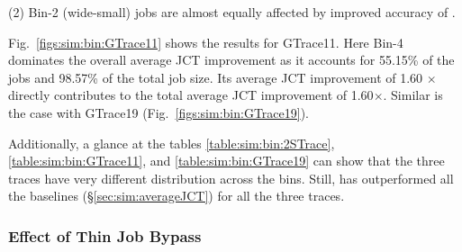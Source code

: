 (2) Bin-2 (wide-small) jobs are almost equally affected by improved accuracy of \slearn.


Fig.~\ref{figs:sim:bin:GTrace11} shows the results for GTrace11.
Here Bin-4 dominates the overall average JCT improvement as it accounts for
55.15\% of the jobs and 98.57\% of the total job size.  Its average JCT
improvement of 1.60 $\times$ directly contributes to the total average JCT
improvement of 1.60$\times$. Similar is the case with GTrace19
(Fig.~\ref{figs:sim:bin:GTrace19}).

Additionally, a glance at the tables \ref{table:sim:bin:2STrace},
\ref{table:sim:bin:GTrace11}, and \ref{table:sim:bin:GTrace19} can show that the
three traces have very different distribution across the bins. Still, \slearn
has outperformed all the baselines (\S\ref{sec:sim:averageJCT}) for all the
three traces. 


\subsubsection{Effect of Thin Job Bypass}
\label{sec:sim:thin}

